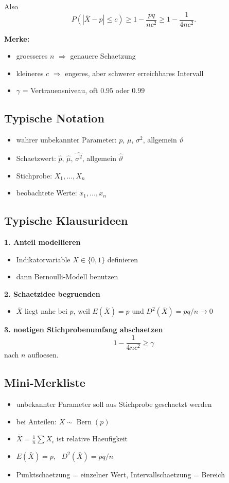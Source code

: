 \documentclass[a4paper,11pt]{article}
\begin{document}
Also
\[
P(|\bar X-p|\le c)\ge 1-\frac{pq}{nc^2}\ge 1-\frac{1}{4nc^2}.
\]

\textbf{Merke:}
\begin{itemize}
  \item groesseres $n$ $\Rightarrow$ genauere Schaetzung
  \item kleineres $c$ $\Rightarrow$ engeres, aber schwerer erreichbares Intervall
  \item $\gamma$ = Vertrauensniveau, oft $0.95$ oder $0.99$
\end{itemize}

\subsection{Typische Notation}
\begin{itemize}
  \item wahrer unbekannter Parameter: $p$, $\mu$, $\sigma^2$, allgemein $\vartheta$
  \item Schaetzwert: $\hat p$, $\hat\mu$, $\widehat{\sigma^2}$, allgemein $\hat\vartheta$
  \item Stichprobe: $X_1,\dots,X_n$
  \item beobachtete Werte: $x_1,\dots,x_n$
\end{itemize}

\subsection{Typische Klausurideen}
\textbf{1. Anteil modellieren}
\begin{itemize}
  \item Indikatorvariable $X\in\{0,1\}$ definieren
  \item dann Bernoulli-Modell benutzen
\end{itemize}

\textbf{2. Schaetzidee begruenden}
\begin{itemize}
  \item $\bar X$ liegt nahe bei $p$, weil $E(\bar X)=p$ und $D^2(\bar X)=pq/n\to 0$
\end{itemize}

\textbf{3. noetigen Stichprobenumfang abschaetzen}
\[
1-\frac{1}{4nc^2}\ge \gamma
\]
nach $n$ aufloesen.

\subsection{Mini-Merkliste}
\begin{itemize}
  \item unbekannter Parameter soll aus Stichprobe geschaetzt werden
  \item bei Anteilen: $X\sim \operatorname{Bern}(p)$
  \item $\bar X=\frac1n\sum X_i$ ist relative Haeufigkeit
  \item $E(\bar X)=p$, \ $D^2(\bar X)=pq/n$
  \item Punktschaetzung = einzelner Wert, Intervallschaetzung = Bereich
\end{itemize}
\end{document}
